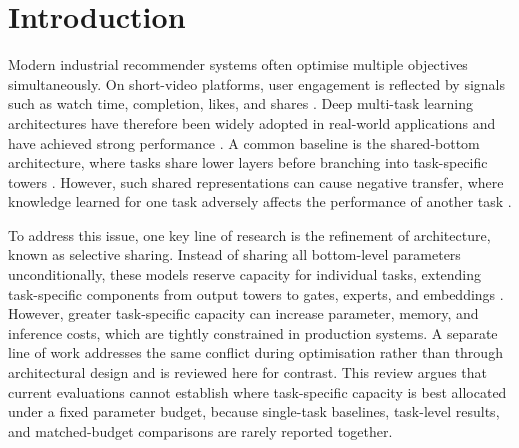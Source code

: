 \section{Introduction} 
Modern industrial recommender systems often optimise multiple objectives simultaneously. On short-video platforms, user engagement is reflected by signals such as watch time, completion, likes, and shares \citep{cai2024twostage}. Deep multi-task learning architectures have therefore been widely adopted in real-world applications and have achieved strong performance \citep{Ma2018MMoE, wang2025home, Zhang2026SMES}. A common baseline is the shared-bottom architecture, where tasks share lower layers before branching into task-specific towers \citep{Ma2018MMoE}. However, such shared representations can cause negative transfer, where knowledge learned for one task adversely affects the performance of another task \citep{Tang2020PLE}.

To address this issue, one key line of research is the refinement of architecture, known as selective sharing. Instead of sharing all bottom-level parameters unconditionally, these models reserve capacity for individual tasks, extending task-specific components from output towers to gates, experts, and embeddings \citep{Ma2018MMoE, Tang2020PLE, Su2024STEM}. However, greater task-specific capacity can increase parameter, memory, and inference costs, which are tightly constrained in production systems. A separate line of work addresses the same conflict during optimisation rather than through architectural design \citep{Chen2018GradNorm, Yu2020PCGrad, Bai2024GradCraft} and is reviewed here for contrast. This review argues that current evaluations cannot establish where task-specific capacity is best allocated under a fixed parameter budget, because single-task baselines, task-level results, and matched-budget comparisons are rarely reported together.





